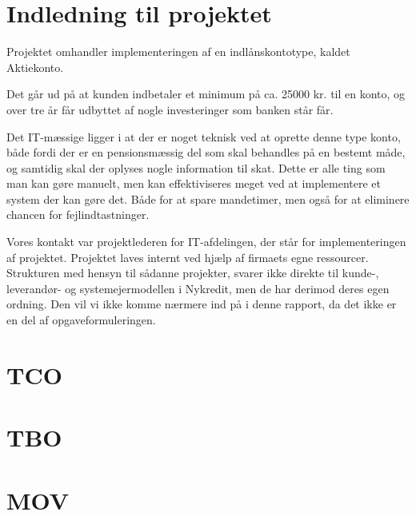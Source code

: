 \documentclass[12pt,a4paper,oneside]{article}
\begin{document}
\section{Indledning til projektet}
Projektet omhandler implementeringen af en indlånskontotype, kaldet Aktiekonto.

Det går ud på at kunden indbetaler et minimum på ca. 25000 kr. til en konto, og
over tre år får udbyttet af nogle investeringer som banken står får.

Det IT-mæssige ligger i at der er noget teknisk ved at oprette denne type konto,
både fordi der er en pensionsmæssig del som skal behandles på en bestemt måde, og
samtidig skal der oplyses nogle information til skat. Dette er alle ting som man
kan gøre manuelt, men kan effektiviseres meget ved at implementere et system der
kan gøre det. Både for at spare mandetimer, men også for at eliminere chancen
for fejlindtastninger.

Vores kontakt var projektlederen for IT-afdelingen, der står for
implementeringen af projektet. Projektet laves internt ved hjælp af firmaets
egne ressourcer. Strukturen med hensyn til sådanne projekter, svarer
ikke direkte til kunde-, leverandør- og systemejermodellen i Nykredit, men de
har derimod deres egen ordning. Den vil vi ikke komme nærmere ind på i denne
rapport, da det ikke er en del af opgaveformuleringen.

\section{TCO}


\section{TBO}


\section{MOV}

\end{document}
